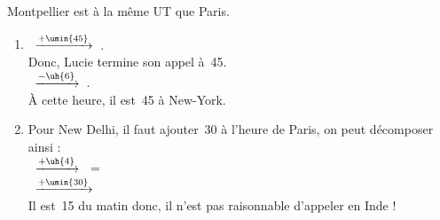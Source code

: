    Montpellier est à la même UT que Paris. \\
   \begin{enumerate}
      \item {}\, \quad $\xrightarrow{+\umin{45}}$ \quad {}\,. \\
         Donc, Lucie termine son appel à \,45. \\ [1mm]
         \, \quad $\xrightarrow{-\uh{6}}$ \quad {}\,. \\
         À cette heure, il est {\blue {}\,45} à New-York.
      \item Pour New Delhi, il faut ajouter \,30 à l'heure de Paris, on peut décomposer ainsi : \\ [1mm]
         \, \quad $\xrightarrow{+\uh{4}}$ \quad {}\, = \,\\ [1mm]
         \, \quad $\xrightarrow{+\umin{30}}$ \quad {}\, \\ [1mm]
         Il est \,15 du matin donc, {\blue il n'est pas raisonnable d'appeler en Inde !}
   \end{enumerate}
